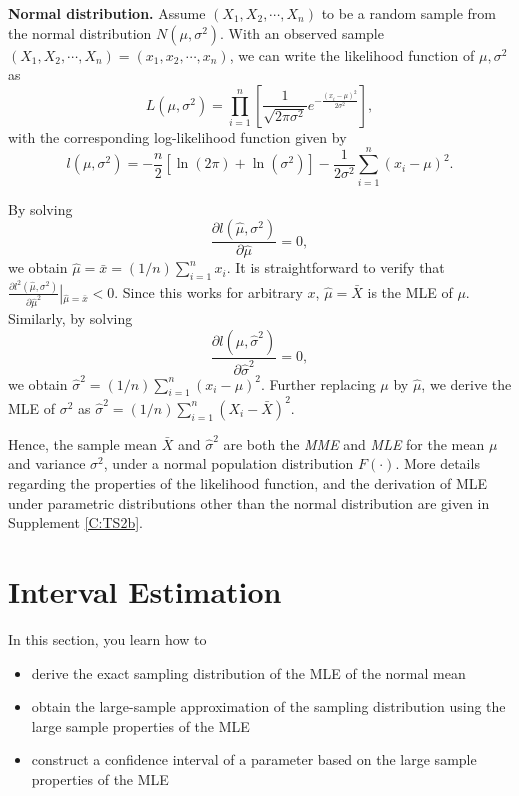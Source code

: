 \documentclass[]{book}
\providecommand{\tightlist}{%
  \setlength{\itemsep}{0pt}\setlength{\parskip}{0pt}}
\theoremstyle{definition}
\theoremstyle{definition}
\theoremstyle{definition}
\theoremstyle{remark}
\begin{document}
\textbf{Normal distribution.} Assume \((X_1,X_2,\cdots,X_n)\) to be a
random sample from the normal distribution \(N(\mu, \sigma^2)\). With an
observed sample \((X_1,X_2,\cdots,X_n)=(x_1,x_2,\cdots,x_n)\), we can
write the likelihood function of \(\mu,\sigma^2\) as
\[L(\mu,\sigma^2)=\prod_{i=1}^n\left[\frac{1}{\sqrt{2\pi\sigma^2}}e^{-\frac{\left(x_i-\mu\right)^2}{2\sigma^2}}\right],\]
with the corresponding log-likelihood function given by
\[l(\mu,\sigma^2)=-\frac{n}{2}[\ln(2\pi)+\ln(\sigma^2)]-\frac{1}{2\sigma^2}\sum_{i=1}^n\left(x_i-\mu\right)^2.\]

By solving
\[\frac{\partial l(\hat{\mu},\sigma^2)}{\partial \hat{\mu}}=0,\] we
obtain \(\hat{\mu}=\bar{x}=(1/n)\sum_{i=1}^nx_i\). It is straightforward
to verify that
\(\frac{\partial l^2(\hat{\mu},\sigma^2)}{\partial \hat{\mu}^2}\left|_{\hat{\mu}=\bar{x}}\right.<0\).
Since this works for arbitrary \(x\), \(\hat{\mu}=\bar{X}\) is the MLE
of \(\mu\). Similarly, by solving
\[\frac{\partial l(\mu,\hat{\sigma}^2)}{\partial \hat{\sigma}^2}=0,\] we
obtain \(\hat{\sigma}^2=(1/n)\sum_{i=1}^n(x_i-\mu)^2\). Further
replacing \(\mu\) by \(\hat{\mu}\), we derive the MLE of \(\sigma^2\) as
\(\hat{\sigma}^2=(1/n)\sum_{i=1}^n(X_i-\bar{X})^2\).

Hence, the sample mean \(\bar{X}\) and \(\hat{\sigma}^2\) are both the
\emph{MME} and \emph{MLE} for the mean \(\mu\) and variance
\(\sigma^2\), under a normal population distribution \(F(\cdot)\). More
details regarding the properties of the likelihood function, and the
derivation of MLE under parametric distributions other than the normal
distribution are given in Supplement \ref{C:TS2b}.

\section{Interval Estimation}\label{S:TS1:IE}

In this section, you learn how to

\begin{itemize}
\tightlist
\item
  derive the exact sampling distribution of the MLE of the normal mean
\item
  obtain the large-sample approximation of the sampling distribution
  using the large sample properties of the MLE
\item
  construct a confidence interval of a parameter based on the large
  sample properties of the MLE
\end{itemize}
\end{document}
